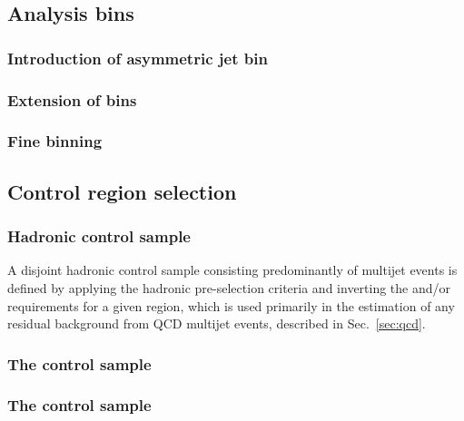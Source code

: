 
\subsection{Analysis bins}


\subsubsection{Introduction of asymmetric jet bin}


\subsubsection{Extension of \HT bins}

\subsubsection{Fine \njet binning}

\subsection{Control region selection}

\subsubsection{Hadronic control sample}

A disjoint hadronic control sample consisting predominantly of
multijet events is defined by applying the hadronic pre-selection
criteria and inverting the \alphat and/or \mhtmet requirements for a
given \scalht region, which is used primarily in the estimation of any
residual background from QCD multijet events, described in
Sec.~\ref{sec:qcd}.

\subsubsection{The \texorpdfstring{\mj}{muon plus jets} control sample}

\subsubsection{The \texorpdfstring{\mmj}{di-muon plus jets} control sample}

